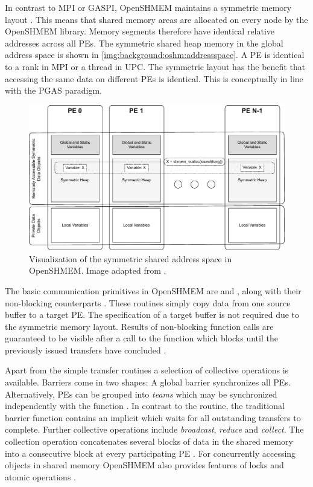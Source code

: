 In contrast to \ac{MPI} or \ac{GASPI}, \ac{OpenSHMEM} maintains a symmetric memory layout \cite[p.~32]{oshm-tut}. This means that shared memory areas are allocated on every node by the \ac{OpenSHMEM} library. Memory segments therefore have identical relative addresses across all \acp{PE}. The symmetric shared heap memory in the global address space is shown in \autoref{img:background:oshm:addressspace}. A \ac{PE} is identical to a rank in \ac{MPI} or a thread in \ac{UPC}. The symmetric layout has the benefit that accessing the same data on different \acp{PE} is identical. This is conceptually in line with the \ac{PGAS} paradigm.

\begin{figure}[htb]
\centering
\includegraphics[width=\textwidth]{img/pgas-oshm-addressspace}
\caption{Visualization of the symmetric shared address space in \acs{OpenSHMEM}. Image adapted from \cite[ch.~3]{oshm-std}.}
\label{img:background:oshm:addressspace}
\end{figure}

The basic communication primitives in \ac{OpenSHMEM} are  and , along with their non-blocking counterparts \cite[ch.~9.6]{oshm-std}. These routines simply copy data from one source buffer to a target \ac{PE}. The specification of a target buffer is not required due to the symmetric memory layout. Results of non-blocking function calls are guaranteed to be visible after a call to the function  which blocks until the previously issued transfers have concluded \cite[ch.~9.11.2]{oshm-std}.

Apart from the simple transfer routines a selection of collective operations is available. Barriers come in two shapes: A global barrier synchronizes all \acp{PE}. Alternatively, \acp{PE} can be grouped into \emph{teams} which may be synchronized independently with the  function \cite[ch.~9.9.3]{oshm-std}. In contrast to the  routine, the traditional barrier function contains an implicit  which waits for all outstanding transfers to complete. Further collective operations include \emph{broadcast}, \emph{reduce} and \emph{collect}. The collection operation concatenates several blocks of data in the shared memory into a consecutive block at every participating \ac{PE} \cite[ch.~9.9.8]{oshm-std}. For concurrently accessing objects in shared memory \ac{OpenSHMEM} also provides features of locks and atomic operations \cite[ch.~9.12.1, ch.~9.7]{oshm-std}.

